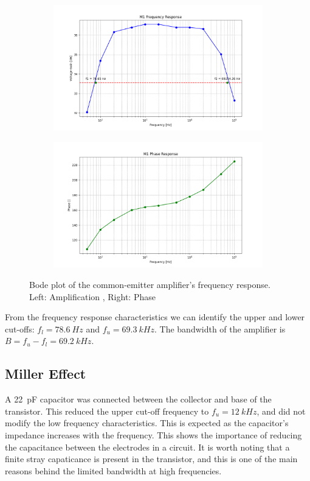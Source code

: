 \documentclass[12pt,a4paper]{article}
\begin{document}
\begin{figure}[H]
    \centering
    \begin{subfigure}[b]{0.48\linewidth}
        \centering
        \includegraphics[width=\linewidth]{m1_frequency_response.png}
    \end{subfigure}\hfill
    \begin{subfigure}[b]{0.48\linewidth}
        \centering
        \includegraphics[width=\linewidth]{m1_phase_response.png}
    \end{subfigure}
    \caption{Bode plot of the common-emitter amplifier's frequency response. Left: Amplification , Right: Phase}
    \label{fig:bode_plot_m1}
\end{figure}

From the frequency response characteristics we can identify the upper and lower cut-offs: $f_l = \SI{78.6}{Hz}$ and $f_u = \SI{69.3}{kHz}$. The bandwidth of the amplifier is $B = f_u - f_l = \SI{69.2}{kHz}$. 

\subsection{Miller Effect}
A \SI{22}{pF} capacitor was connected between the collector and base of the transistor. This reduced the upper cut-off frequency to $f_u = \SI{12}{kHz}$, and did not modify the low frequency characteristics. This is expected as the capacitor's impedance increases with the frequency. This shows the importance of reducing the capacitance between the electrodes in a circuit. It is worth noting that a finite stray capaticance is present in the transistor, and this is one of the main reasons behind the limited bandwidth at high frequencies.
\end{document}
